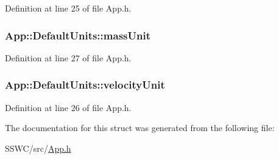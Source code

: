 Definition at line 25 of file App.\+h.

\hypertarget{struct_app_1_1_default_units_a6fd33188cebaa3e473af9d9b265624da}{
\subsubsection[{mass\+Unit}]{ App\+::\+Default\+Units\+::mass\+Unit}}\label{struct_app_1_1_default_units_a6fd33188cebaa3e473af9d9b265624da}


Definition at line 27 of file App.\+h.

\hypertarget{struct_app_1_1_default_units_a828b643678f6cc966772f1cfdb74b7d5}{
\subsubsection[{velocity\+Unit}]{ App\+::\+Default\+Units\+::velocity\+Unit}}\label{struct_app_1_1_default_units_a828b643678f6cc966772f1cfdb74b7d5}


Definition at line 26 of file App.\+h.



The documentation for this struct was generated from the following file\+:\begin{DoxyCompactItemize}
\item 
S\+S\+W\+C/src/\hyperlink{_app_8h}{App.\+h}\end{DoxyCompactItemize}
